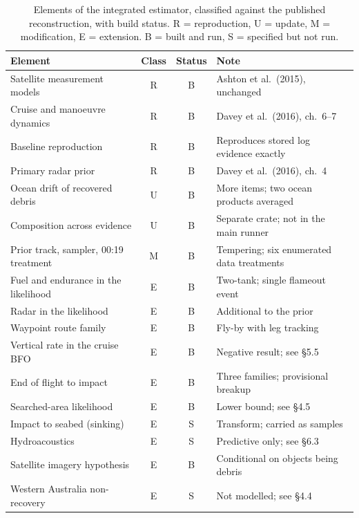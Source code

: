 \documentclass[12pt,a4paper]{article}
\begin{document}
\begin{table}[htbp]
\centering
\caption{Elements of the integrated estimator, classified against the published reconstruction,
with build status. R = reproduction, U = update, M = modification, E = extension.
B = built and run, S = specified but not run.}
\vspace{4pt}
\small
\begin{tabular}{@{}p{4.9cm}cc p{6.6cm}@{}}
\toprule
Element & Class & Status & Note \\
\midrule
Satellite measurement models        & R & B & Ashton et al.\ (2015), unchanged \\
Cruise and manoeuvre dynamics       & R & B & Davey et al.\ (2016), ch.\ 6--7 \\
Baseline reproduction               & R & B & Reproduces stored log evidence exactly \\
Primary radar prior                 & R & B & Davey et al.\ (2016), ch.\ 4 \\
Ocean drift of recovered debris     & U & B & More items; two ocean products averaged \\
Composition across evidence         & U & B & Separate crate; not in the main runner \\
Prior track, sampler, 00:19 treatment & M & B & Tempering; six enumerated data treatments \\
Fuel and endurance in the likelihood & E & B & Two-tank; single flameout event \\
Radar in the likelihood             & E & B & Additional to the prior \\
Waypoint route family               & E & B & Fly-by with leg tracking \\
Vertical rate in the cruise BFO     & E & B & Negative result; see \S5.5 \\
End of flight to impact             & E & B & Three families; provisional breakup \\
Searched-area likelihood            & E & B & Lower bound; see \S4.5 \\
Impact to seabed (sinking)          & E & S & Transform; carried as samples \\
Hydroacoustics                      & E & S & Predictive only; see \S6.3 \\
Satellite imagery hypothesis        & E & B & Conditional on objects being debris \\
Western Australia non-recovery      & E & S & Not modelled; see \S4.4 \\
\bottomrule
\end{tabular}
\end{table}
\end{document}
